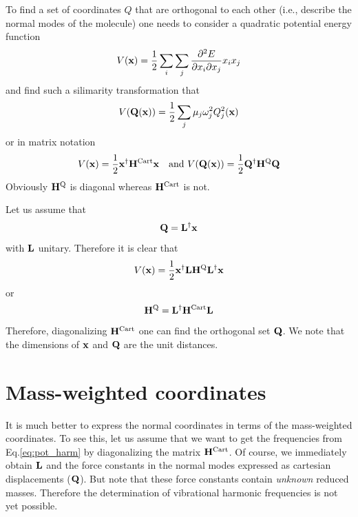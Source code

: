 \documentclass[a4paper,titlepage,twoside,fleqn,12pt]{book}
\begin{document}
\begin{appendices}
To find a set of coordinates $Q$ that are orthogonal to each other (i.e., describe the normal 
modes of the molecule) one needs to consider a quadratic potential energy function
\begin{equation}
V({\bf x}) = \frac{1}{2} \sum_i\sum_j \frac{\partial^2 E}{\partial x_i \partial x_j} x_i x_j
\end{equation}
and find such a silimarity transformation that
\begin{equation}\label{eq:pot_harm}
V({\bf Q}({\bf x})) = \frac{1}{2} \sum_j \mu_j \omega_j^2 Q_j^2({\bf x})
\end{equation}
or in matrix notation
\begin{equation}
V({\bf x}) = \frac{1}{2} {\bf x}^{\dagger} {\bf H}^{\rm Cart} {\bf x}  \quad \textrm{and   } V({\bf Q}({\bf x})) = \frac{1}{2} {\bf Q}^{\dagger} {\bf H}^{\rm Q} {\bf Q} 
\end{equation}
Obviously ${\bf H}^{\rm Q}$ is diagonal whereas ${\bf H}^{\rm Cart}$ is not. 

Let us assume that
\begin{equation}
{\bf Q} = {\bf L}^{\dagger} {\bf x}
\end{equation}
with ${\bf L}$ unitary.
Therefore it is clear that
\begin{equation}
V({\bf x}) = \frac{1}{2} {\bf x}^{\dagger} {\bf L} {\bf H}^{\rm Q} {\bf L}^{\dagger} {\bf x}
\end{equation}
or
\begin{equation}
{\bf H}^{\rm Q} = {\bf L}^{\dagger} {\bf H}^{\rm Cart} {\bf L}
\end{equation}
Therefore, diagonalizing ${\bf H}^{\rm Cart}$ one can find the orthogonal 
set ${\bf Q}$. We note that the dimensions of ${\bf x}$ and ${\bf Q}$ are the unit distances.

\section{Mass-weighted coordinates}

It is much better to express the normal coordinates in terms of the mass-weighted coordinates.
To see this, let us assume that we want to get the frequencies from Eq.\eqref{eq:pot_harm} by diagonalizing
the matrix ${\bf H}^{\rm Cart}$. Of course, we immediately obtain ${\bf L}$ and the force constants
in the normal modes expressed as cartesian displacements (${\bf Q}$). But note that these force constants 
contain \emph{unknown} reduced masses.
Therefore the determination of vibrational harmonic frequencies is not yet possible. 


\end{appendices}
\end{document}
